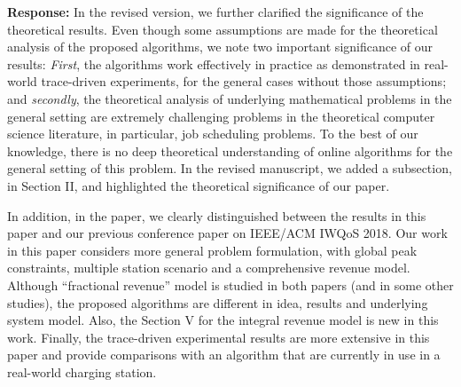 \documentclass[11pt]{article}
\newcommand{\bt}[1]{{\color{red}#1}}%
\newcommand{\bt}[1]{#1}
\begin{document}
\vspace{5mm}
\noindent\textbf{Response:}
In the revised version, we further clarified the significance of the theoretical results. Even though some assumptions are made for the theoretical analysis of the proposed algorithms, we note two important significance of our results: \textit{First}, the algorithms work effectively in practice as demonstrated in real-world trace-driven experiments, for the general cases without those assumptions; and \textit{secondly}, the theoretical analysis of underlying mathematical problems in the general setting are extremely challenging problems in the theoretical computer science literature, in particular, job scheduling problems. To the best of our knowledge, there is no deep theoretical understanding of online algorithms for the general setting of this problem. In the revised manuscript, we added a subsection, in Section II, and highlighted the theoretical significance of our paper. 

In addition, in the paper, we clearly distinguished between the results in this paper and our previous conference paper on IEEE/ACM IWQoS 2018. Our work in this paper considers more general problem formulation, with global peak constraints, multiple station scenario and a comprehensive revenue model. \bt{Although  ``fractional revenue'' model is studied in both papers (and in some other studies), the proposed algorithms are  different in idea, results and underlying system model. Also, the Section V for the integral revenue model is new in this work. Finally, the trace-driven experimental results are more extensive in this paper and provide comparisons with an algorithm that are currently in use in a real-world charging station. }




\newpage
\end{document}
